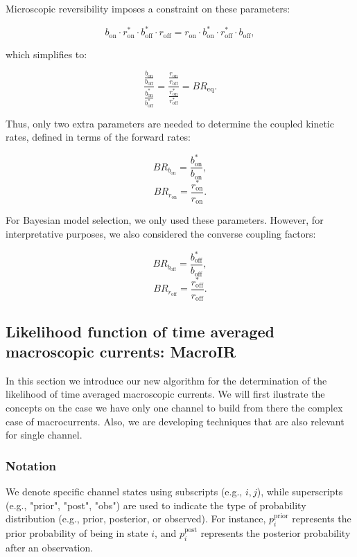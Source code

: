 \documentclass[pdflatex,sn-nature]{sn-jnl}%
\theoremstyle{thmstyleone}%
\theoremstyle{thmstyletwo}%
\theoremstyle{thmstylethree}%
\begin{document}
Microscopic reversibility imposes a constraint on these parameters:

\[
b_{\text{on}} \cdot r^*_{\text{on}} \cdot b^*_{\text{off}} \cdot r_{\text{off}} = r_{\text{on}} \cdot b^*_{\text{on}} \cdot r^*_{\text{off}} \cdot b_{\text{off}},
\]

which simplifies to:

\[
\frac {\frac {b_{\text{on}}}{b_{\text{off}}}}{\frac {b^*_{\text{on}}} {b^*_{\text{off}}}} = \frac {\frac {r_{\text{on}}}{r_{\text{off}}}}{\frac {r^*_{\text{on}}} {r^*_{\text{off}}}} = BR_{\text{eq}}.
\]

Thus, only two extra parameters are needed to determine the coupled kinetic rates, defined in terms of the forward rates:

\[
BR_{b_{\text{on}}} = \frac{b^*_{\text{on}}}{b_{\text{on}}},
\]
\[
BR_{r_{\text{on}}} = \frac{r^*_{\text{on}}}{r_{\text{on}}}.
\]

For Bayesian model selection, we only used these parameters. However, for interpretative purposes, we also considered the converse coupling factors:

\[
BR_{b_{\text{off}}} = \frac{b^*_{\text{off}}}{b_{\text{off}}},
\]
\[
BR_{r_{\text{off}}} = \frac{r^*_{\text{off}}}{r_{\text{off}}}.
\]

\subsection{Likelihood function of time averaged macroscopic currents: MacroIR}
In this section we introduce our new algorithm for the determination of the likelihood of time averaged macroscopic currents. We will first ilustrate the concepts on the case we have only one channel to build from there the complex case of macrocurrents. Also, we are developing techniques that are also relevant for single channel.   

\subsubsection{Notation}
We denote specific channel states using subscripts (e.g., \( i, j \)), while superscripts (e.g., "prior", "post", "obs") are used to indicate the type of probability distribution (e.g., prior, posterior, or observed). For instance, \( p_i^{\text{prior}} \) represents the prior probability of being in state \( i \), and \( p_i^{\text{post}} \) represents the posterior probability after an observation.

\end{document}
